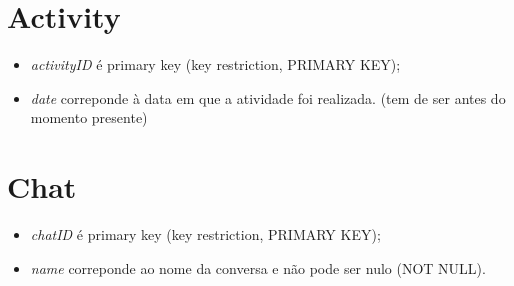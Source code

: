 \documentclass[12pt]{report}
\begin{document}
\section{Activity}

\begin{itemize}
    \item \textit{activityID} é primary key (key restriction, PRIMARY KEY);
    \item \textit{date} correponde à data em que a atividade foi realizada. (tem de ser antes do momento presente)
\end{itemize}

\section{Chat}

\begin{itemize}
    \item \textit{chatID} é primary key (key restriction, PRIMARY KEY);
    \item \textit{name} correponde ao nome da conversa e não pode ser nulo (NOT NULL).
\end{itemize}
\end{document}
